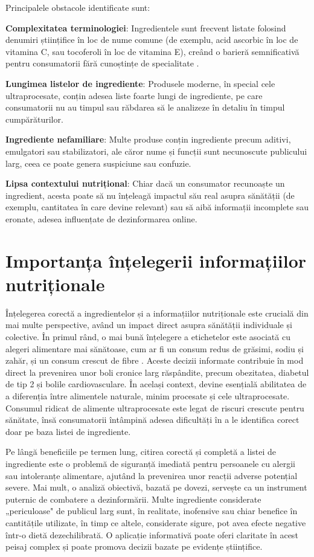 Principalele obstacole identificate sunt:

\textbf{Complexitatea terminologiei}: Ingredientele sunt frecvent listate folosind denumiri științifice în loc de nume comune (de exemplu, acid ascorbic în loc de vitamina C, sau tocoferoli în loc de vitamina E), creând o barieră semnificativă pentru consumatorii fără cunoștințe de specialitate \cite{Grunert2010}.

\textbf{Lungimea listelor de ingrediente}: Produsele moderne, în special cele ultraprocesate, conțin adesea liste foarte lungi de ingrediente, pe care consumatorii nu au timpul sau răbdarea să le analizeze în detaliu în timpul cumpărăturilor.

\textbf{Ingrediente nefamiliare}: Multe produse conțin ingrediente precum aditivi, emulgatori sau stabilizatori, ale căror nume și funcții sunt necunoscute publicului larg, ceea ce poate genera suspiciune sau confuzie.

\textbf{Lipsa contextului nutrițional}: Chiar dacă un consumator recunoaște un ingredient, acesta poate să nu înțeleagă impactul său real asupra sănătății (de exemplu, cantitatea în care devine relevant) sau să aibă informații incomplete sau eronate, adesea influențate de dezinformarea online.

\section{Importanța înțelegerii informațiilor nutriționale}

Înțelegerea corectă a ingredientelor și a informațiilor nutriționale este crucială din mai multe perspective, având un impact direct asupra sănătății individuale și colective. În primul rând, o mai bună înțelegere a etichetelor este asociată cu alegeri alimentare mai sănătoase, cum ar fi un consum redus de grăsimi, sodiu și zahăr, și un consum crescut de fibre \cite{Campos2011}. Aceste decizii informate contribuie în mod direct la prevenirea unor boli cronice larg răspândite, precum obezitatea, diabetul de tip 2 și bolile cardiovasculare. În același context, devine esențială abilitatea de a diferenția între alimentele naturale, minim procesate și cele ultraprocesate. Consumul ridicat de alimente ultraprocesate este legat de riscuri crescute pentru sănătate, însă consumatorii întâmpină adesea dificultăți în a le identifica corect doar pe baza listei de ingrediente.

Pe lângă beneficiile pe termen lung, citirea corectă și completă a listei de ingrediente este o problemă de siguranță imediată pentru persoanele cu alergii sau intoleranțe alimentare, ajutând la prevenirea unor reacții adverse potențial severe. Mai mult, o analiză obiectivă, bazată pe dovezi, servește ca un instrument puternic de combatere a dezinformării. Multe ingrediente considerate „periculoase" de publicul larg sunt, în realitate, inofensive sau chiar benefice în cantitățile utilizate, în timp ce altele, considerate sigure, pot avea efecte negative într-o dietă dezechilibrată. O aplicație informativă poate oferi claritate în acest peisaj complex și poate promova decizii bazate pe evidențe științifice.
